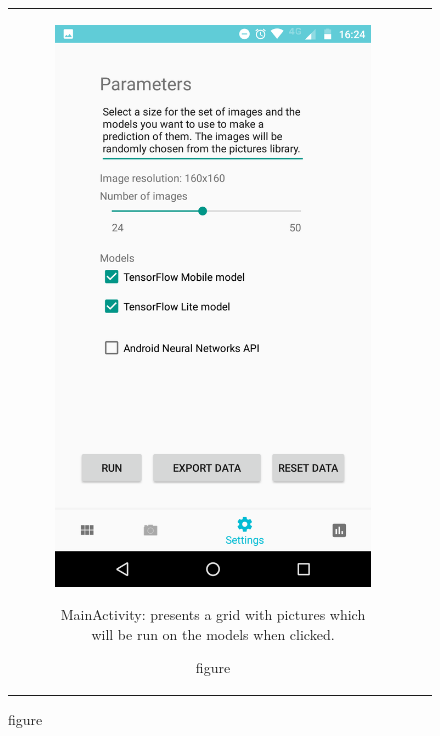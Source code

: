 \documentclass{article}
\begin{document}
\begin{figure}[!h]
\captionsetup[subfigure]{position=b}
  \centering
  \begin{tabular}[c]{cc}
    \begin{subfigure}[c]{0.4\textwidth}
      \includegraphics[width=\textwidth]{img/app/settings.png}
      \caption{figure}{\footnotesize MainActivity: presents a grid with pictures which will be run on the models when clicked.}
      \label{fig:MainActivity}
    \end{subfigure}&

\end{tabular}
\end{figure}
\end{document}
